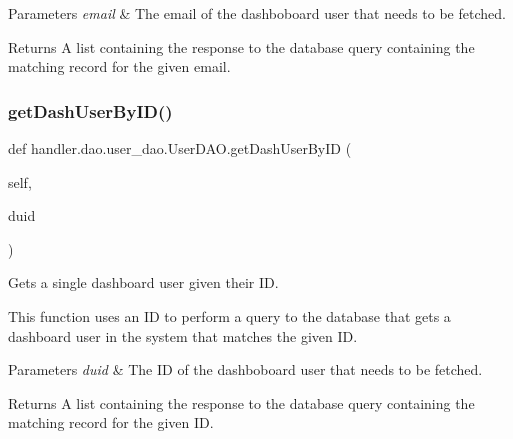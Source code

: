 \begin{DoxyParams}{Parameters}
{\em email} & The email of the dashboboard user that needs to be fetched.\\
\hline
\end{DoxyParams}
\begin{DoxyReturn}{Returns}
A list containing the response to the database query containing the matching record for the given email. 
\end{DoxyReturn}
\mbox{\label{classhandler_1_1dao_1_1user__dao_1_1_user_d_a_o_ad9be9aa0752a73abc15d413ff6f6f640}} 
\subsubsection{\texorpdfstring{get\+Dash\+User\+By\+I\+D()}{getDashUserByID()}}
{\footnotesize\ttfamily def handler.\+dao.\+user\+\_\+dao.\+User\+D\+A\+O.\+get\+Dash\+User\+By\+ID (\begin{DoxyParamCaption}\item[{}]{self,  }\item[{}]{duid }\end{DoxyParamCaption})}



Gets a single dashboard user given their ID. 

This function uses an ID to perform a query to the database that gets a dashboard user in the system that matches the given ID.


\begin{DoxyParams}{Parameters}
{\em duid} & The ID of the dashboboard user that needs to be fetched.\\
\hline
\end{DoxyParams}
\begin{DoxyReturn}{Returns}
A list containing the response to the database query containing the matching record for the given ID. 
\end{DoxyReturn}
\mbox{\label{classhandler_1_1dao_1_1user__dao_1_1_user_d_a_o_a8c86f277f03acade4ca12983f0a05d10}} 
